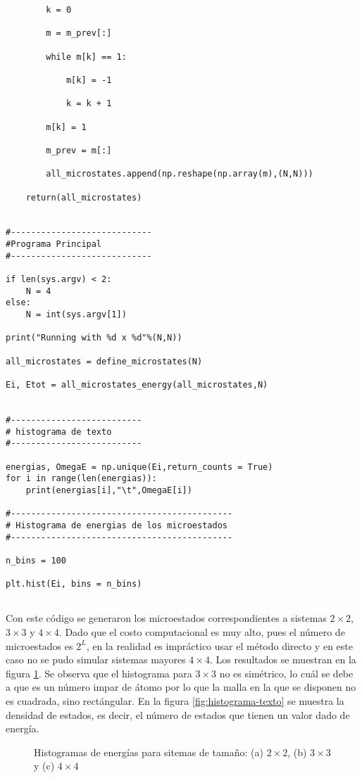 \documentclass[a4paper,12pt]{article}
\begin{document}
\begin{verbatim}
        k = 0
    
        m = m_prev[:]
    
        while m[k] == 1:
        
            m[k] = -1
        
            k = k + 1
        
        m[k] = 1
    
        m_prev = m[:]
            
        all_microstates.append(np.reshape(np.array(m),(N,N)))
        
    return(all_microstates)


#----------------------------
#Programa Principal
#----------------------------

if len(sys.argv) < 2:
    N = 4
else:
    N = int(sys.argv[1])

print("Running with %d x %d"%(N,N))

all_microstates = define_microstates(N)

Ei, Etot = all_microstates_energy(all_microstates,N)


#--------------------------
# histograma de texto
#--------------------------

energias, OmegaE = np.unique(Ei,return_counts = True)
for i in range(len(energias)):
    print(energias[i],"\t",OmegaE[i])

#--------------------------------------------
# Histograma de energias de los microestados
#--------------------------------------------

n_bins = 100

plt.hist(Ei, bins = n_bins)


   \end{verbatim}

   \noindent Con este código se generaron los microestados correspondientes a sistemas $2 \times 2$, $3 \times 3$ y $4 \times 4$. Dado que el costo computacional es muy alto, pues el número de microestados es $2^L$, en la realidad es impráctico usar el método directo y en este caso no se pudo simular sistemas mayores $4 \times 4$. Los resultados se muestran en la figura \ref{fig:histogramas-directo}. Se observa que el histograma para $3 \times 3$ no es simétrico, lo cuál se debe a que es un número impar de átomo por lo que la malla en la que se disponen no es cuadrada, sino rectángular. En la figura \ref{fig:histograma-texto} se muestra la densidad de estados, es decir, el número de estados que tienen un valor dado de energía. 

   \begin{figure}[H]
     \centering
     \caption{Histogramas de energías para sitemas de tamaño: (a)  $2 \times 2$, (b) $3 \times 3$ y (c) $4 \times 4$}
     \label{fig:histogramas-directo}
   \end{figure}
\end{document}
